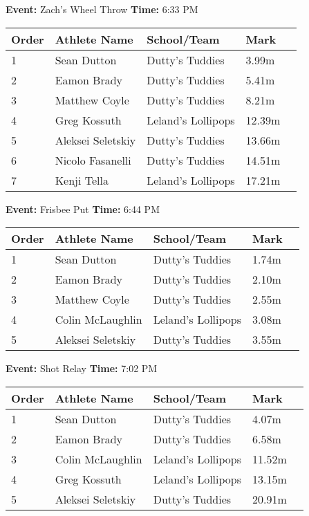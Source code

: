 \documentclass[11pt]{article}
\begin{document}
\textbf{Event:} Zach's Wheel Throw \quad \textbf{Time:} 6:33 PM 

\vspace{1em}
\begin{tabular}{@{}lllll@{}}
\toprule

\textbf{Order} & \textbf{Athlete Name} & \textbf{School/Team} & \textbf{Mark} \\
\midrule
1 & Sean Dutton & Dutty's Tuddies & 3.99m &\\
2 & Eamon Brady & Dutty's Tuddies & 5.41m &\\
3 & Matthew Coyle & Dutty's Tuddies & 8.21m &\\
4 & Greg Kossuth & Leland's Lollipops & 12.39m &\\
5 & Aleksei Seletskiy & Dutty's Tuddies & 13.66m &\\
6 & Nicolo Fasanelli & Dutty's Tuddies & 14.51m &\\
7 & Kenji Tella & Leland's Lollipops & 17.21m &\\
\bottomrule
\end{tabular}
\vspace{2.5em}


\textbf{Event:} Frisbee Put \quad \textbf{Time:} 6:44 PM 

\vspace{1em}
\begin{tabular}{@{}lllll@{}}
\toprule

\textbf{Order} & \textbf{Athlete Name} & \textbf{School/Team} & \textbf{Mark} \\
\midrule
1 & Sean Dutton & Dutty's Tuddies & 1.74m &\\
2 & Eamon Brady & Dutty's Tuddies & 2.10m &\\
3 & Matthew Coyle & Dutty's Tuddies & 2.55m &\\
4 & Colin McLaughlin & Leland's Lollipops & 3.08m &\\
5 & Aleksei Seletskiy & Dutty's Tuddies & 3.55m &\\
\bottomrule
\end{tabular}
\vspace{2.5em}


\textbf{Event:} Shot Relay \quad \textbf{Time:} 7:02 PM 

\vspace{1em}
\begin{tabular}{@{}lllll@{}}
\toprule

\textbf{Order} & \textbf{Athlete Name} & \textbf{School/Team} & \textbf{Mark} \\
\midrule
1 & Sean Dutton & Dutty's Tuddies & 4.07m &\\
2 & Eamon Brady & Dutty's Tuddies & 6.58m &\\
3 & Colin McLaughlin & Leland's Lollipops & 11.52m &\\
4 & Greg Kossuth & Leland's Lollipops & 13.15m &\\
5 & Aleksei Seletskiy & Dutty's Tuddies & 20.91m &\\
\bottomrule
\end{tabular}
\vspace{2.5em}
\end{document}
